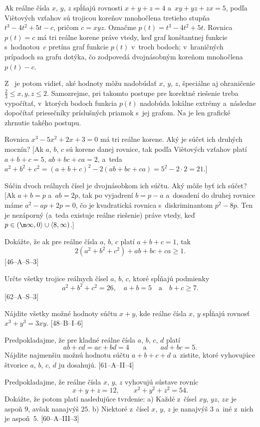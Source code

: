 {\poznamka
Ak reálne čísla $x$, $y$, $z$ spĺňajú rovnosti $x+y+z=4$ a~$xy+yz+zx=5$, podľa Vi\`etových vzťahov sú trojicou koreňov mnohočlena tretieho stupňa
$t^3-4t^2+5t-c$, pričom $c=xyz$. Označme $p(t)=t^3-4t^2+5t$. Rovnica $p(t)=c$ má tri reálne korene práve vtedy, keď graf konštantnej funkcie s~hodnotou~$c$ pretína graf funkcie $p(t)$ v~troch bodoch; v~hraničných prípadoch sa grafu dotýka, čo zodpovedá dvojnásobným koreňom mnohočlena $p(t)-c$.
%

Z~\obr{} je potom vidieť, aké hodnoty môžu nadobúdať $x$, $y$, $z$, špeciálne aj ohraničenie $\frac23\le x,y,z\le2$. Samozrejme, pri takomto postupe pre korektné riešenie treba vypočítať, v~ktorých bodoch funkcia $p(t)$ nadobúda lokálne extrémy a~následne dopočítať priesečníky príslušných priamok s~jej grafom. Na  je len grafické zhrnutie takého postupu.

Rovnica $x^3-5x^2+2x+3=0$ má tri reálne korene. Aký je súčet ich druhých mocnín?
[Ak $a$, $b$, $c$ sú korene danej rovnice, tak podľa Vi\`etových vzťahov platí $a+b+c=5$, $ab+bc+ca=2$, a~teda $a^2+b^2+c^2=(a+b+c)^2-2(ab+bc+ca)=5^2-2\cdot2=21$.]

Súčin dvoch reálnych čísel je dvojnásobkom ich súčtu. Aký môže byť ich súčet?
[Ak $a+b=p$ a~$ab=2p$, tak po vyjadrení $b=p-a$ a~dosadení do druhej rovnice máme $a^2-ap+2p=0$, čo je kvadratická rovnica s~diskriminantom $p^2-8p$. Ten je nezáporný (a~teda existuje reálne riešenie) práve vtedy, keď $p\in(\m\infty,0\rangle\cup\langle8,\infty)$.]

\D
Dokážte, že ak pre reálne čísla $a$, $b$, $c$ platí $a+b+c=1$,
tak
$$
2(a^2+b^2+c^2)+ab+bc+ca\ge1.
$$
[46--A--S--3]

Určte všetky trojice reálnych čísel $a$, $b$, $c$, ktoré spĺňajú podmienky
$$
a^2+b^2+c^2=26,\quad a+b=5\quad\text{a}\quad b+c\ge7.
$$
[62--A--S--3]

Nájdite všetky možné hodnoty súčtu $x+y$,
kde reálne čísla $x$, $y$ spĺňajú rovnosť $x^3+y^3=3xy$.
[48--B--I--6]

Predpokladajme, že pre kladné reálne čísla $a$, $b$, $c$, $d$ platí
$$
ab+cd=ac+bd=4\qquad\text{a}\qquad ad+bc=5.
$$
Nájdite najmenšiu možnú hodnotu súčtu $a+b+c+d$ a~zistite,
ktoré vyhovujúce štvorice $a$, $b$, $c$, $d$ ju dosahujú.
[61--A--II--4]

Predpokladajme, že reálne čísla $x$, $y$, $z$ vyhovujú sústave rovníc
$$
x+y+z=12, \qquad x^2+y^2+z^2=54.
$$
Dokážte, že potom platí nasledujúce tvrdenie:
 a) Každé z~čísel $xy$, $yz$, $zx$ je aspoň $9$, avšak nanajvýš $25$.
 b) Niektoré z~čísel $x$, $y$, $z$ je nanajvýš $3$ a~iné z~nich je aspoň~$5$.
[60--A--III--3]
}


